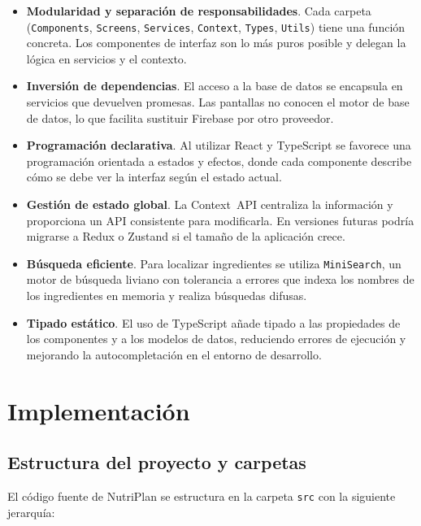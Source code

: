 \documentclass[twoside, openright, 11pt]{report}
\begin{document}
\begin{itemize}
  \item \textbf{Modularidad y separación de responsabilidades}. Cada carpeta (\texttt{Components}, \texttt{Screens}, \texttt{Services}, \texttt{Context}, \texttt{Types}, \texttt{Utils}) tiene una función concreta. Los componentes de interfaz son lo más puros posible y delegan la lógica en servicios y el contexto.
  \item \textbf{Inversión de dependencias}. El acceso a la base de datos se encapsula en servicios que devuelven promesas. Las pantallas no conocen el motor de base de datos, lo que facilita sustituir Firebase por otro proveedor.
  \item \textbf{Programación declarativa}. Al utilizar React y TypeScript se favorece una programación orientada a estados y efectos, donde cada componente describe cómo se debe ver la interfaz según el estado actual.
  \item \textbf{Gestión de estado global}. La Context API centraliza la información y proporciona un API consistente para modificarla. En versiones futuras podría migrarse a Redux o Zustand si el tamaño de la aplicación crece.
  \item \textbf{Búsqueda eficiente}. Para localizar ingredientes se utiliza \texttt{MiniSearch}, un motor de búsqueda liviano con tolerancia a errores que indexa los nombres de los ingredientes en memoria y realiza búsquedas difusas.
  \item \textbf{Tipado estático}. El uso de TypeScript añade tipado a las propiedades de los componentes y a los modelos de datos, reduciendo errores de ejecución y mejorando la autocompletación en el entorno de desarrollo.
\end{itemize}

\chapter{Implementación}
\label{cap.implementacion}

\section{Estructura del proyecto y carpetas}
El código fuente de NutriPlan se estructura en la carpeta \texttt{src} con la siguiente jerarquía:
\end{document}
